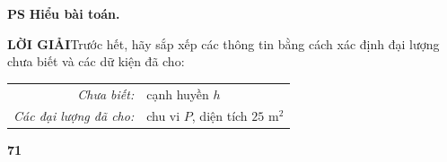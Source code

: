 \noindent
\begin{minipage}[t]{0.26\textwidth}
    \vspace{0pt}%
    \begin{tcolorbox}[
        nobeforeafter,
        colback=stewartpurple!15,
        colframe=stewartpurple!15,
        arc=0mm,
        top=1mm, bottom=1mm, left=1.5mm, right=2mm,
        boxrule=0pt
    ]
        \colorbox{stewartpurple}{\textbf{\textsf{\color{white}\footnotesize PS}}}\; \textbf{\textsf{\footnotesize\color{stewartpurple} Hiểu bài toán.}}
    \end{tcolorbox}
\end{minipage}%
\hfill
\begin{minipage}[t]{0.71\textwidth}
    \vspace{0pt}%
    \noindent\textbf{\textsf{\color{stewartcyan}LỜI GIẢI}}\quad Trước hết, hãy sắp xếp các thông tin bằng cách xác định đại lượng chưa biết và các dữ kiện đã cho:

    \vspace{0.15cm}
    \begin{center}
    \begin{tabular}{rl}
        \textit{Chưa biết:} & cạnh huyền $h$ \\
        \textit{Các đại lượng đã cho:} & chu vi $P$, diện tích $25\text{ m}^2$
    \end{tabular}
    \end{center}
\end{minipage}

\vfill
\noindent\hfill\textbf{\textsf{\small 71}}